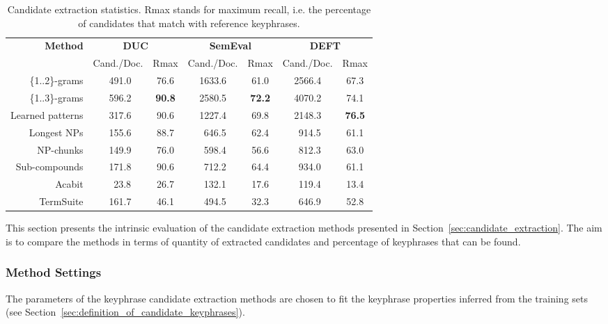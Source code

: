     \begin{table*}
      \centering
      \begin{tabular}{rcccccc}
        \toprule
        \multirow{2}{*}[-2pt]{\textbf{Method}} & \multicolumn{2}{c}{\textbf{DUC}} & \multicolumn{2}{c}{\textbf{SemEval}} & \multicolumn{2}{c}{\textbf{DEFT}}\\
        \cmidrule(r){2-3}\cmidrule(lr){4-5}\cmidrule(l){6-7}
        & Cand./Doc. & Rmax & Cand./Doc. & Rmax & Cand./Doc. & Rmax\\
        \midrule
        \{1..2\}-grams & $~~$491.0 & 76.6 & 1633.6 & 61.0 & 2566.4 & 67.3\\
        \{1..3\}-grams & $~~$596.2 & \textbf{90.8} & 2580.5 & \textbf{72.2} & 4070.2 & 74.1\\
        Learned patterns & $~~$317.6 & 90.6 & 1227.4 & 69.8 & 2148.3 & \textbf{76.5}\\
        Longest NPs & $~~$155.6 & 88.7 & $~~$646.5 & 62.4 & $~~$914.5 & 61.1\\
        NP-chunks & $~~$149.9 & 76.0 & $~~$598.4 & 56.6 & $~~$812.3 & 63.0\\
        Sub-compounds & $~~$171.8 & 90.6 & $~~$712.2 & 64.4 & $~~$934.0 & 61.1\\
        Acabit & $~~~~$23.8 & 26.7 & $~~$132.1 & 17.6 & $~~$119.4 & 13.4\\
        TermSuite & $~~$161.7 & 46.1 & $~~$494.5 & 32.3 & $~~$646.9 & 52.8\\
        \bottomrule
      \end{tabular}
      \caption{Candidate extraction statistics. Rmax stands for maximum recall,
               i.e. the percentage of candidates that match with reference
               keyphrases. \label{tab:candidate_extraction_statistics}}
    \end{table*}

    This section presents the intrinsic evaluation of the candidate extraction
    methods presented in Section~\ref{sec:candidate_extraction}. The aim is to
    compare the methods in terms of quantity of extracted candidates and
    percentage of keyphrases that can be found.

    \subsubsection{Method Settings}
    \label{subsubsec:method_settings}
      The parameters of the keyphrase candidate extraction methods are chosen to
      fit the keyphrase properties inferred from the training sets (see
      Section~\ref{sec:definition_of_candidate_keyphrases}).

